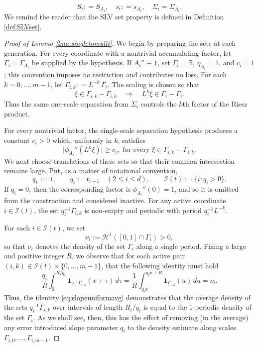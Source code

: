 \documentclass[12pt]{amsart}
\numberwithin{equation}{section}
\begin{document}
$$
S_{i} : = S_{A_i}, \quad s_i : = s_{A_i}, \quad \Sigma_i = \Sigma_{A_i}.
$$
We remind the reader that the SLV set property is defined in Definition \ref{def:SLVset}.

\begin{proof}[Proof of Lemma \ref{lma:singletomulti}]
We begin by preparing the sets at each generation.  For every coordinate with a nontrivial accumulating factor, let $\Gamma_i=\Gamma_{A_i}$ be supplied by the hypothesis.  If $A_i''\equiv1$, set $\Gamma_i=\mathbb R$,
$\eta_{A_i}=1$, and $c_i=1$; this convention imposes no restriction and
contributes no loss.  For each $k = 0,...,m-1$, let
$
\Gamma_{i,k} : = L^{-k} \,\Gamma_i.
$
The scaling is chosen so that
$$
\xi\in\Gamma_{i,k}-\Gamma_{i,k}
\quad\Longrightarrow\quad
L^k\xi\in\Gamma_i-\Gamma_i.
$$
Thus the same one-scale separation from $\Sigma_i$ controls the $k$th factor of the Riesz product.

For every nontrivial factor, the single-scale separation hypothesis produces
a constant $c_i>0$ which, uniformly in $k$, satisfies
\begin{equation}\label{eq:SLVsize}
\big\lvert \phi_{A_i}'' (L^k \xi) \big\rvert \geq c_i, \textrm{ for every } \xi \in \Gamma_{i,k} - \Gamma_{i,k}.
\end{equation}
We next choose translations of these sets so that their common intersection remains large.  Put, as a matter of notational convention,
\[
 q_1:=1,\qquad q_i:=t_{i-1}\quad(2\leq i\leq d),
 \qquad \mathcal I(t):=\{i:q_i>0\}.
\]
If $q_i=0$, then the corresponding factor is
$\phi_{A_i}''(0)=1$, and so it is omitted from the construction and considered inactive. For any active
coordinate $i\in\mathcal I(t)$, the set $q_i^{-1}\Gamma_{i,k}$ is non-empty and periodic with
period $q_i^{-1}L^{-k}$.

For each $i \in \mathcal{I}(t)$, we set
\[
 \nu_i:=\mathcal H^1([0,1]\cap\Gamma_i)>0,
\]
so that $\nu_i$ denotes the density of the set $\Gamma_i$ along a single period. Fixing a large and positive integer $R$, we observe that for each active pair $(i,k) \in \mathcal{I}(t) \times \{0,...,m-1\}$, that the following identity must hold
\begin{equation}\label{eq:slopeuniformavg}
 \frac{q_i}{R}\int_0^{R/q_i}
 \mathbf 1_{q_i^{-1}\Gamma_{i,k}}(x+\tau)\,d\tau =\frac1R\int_{q_ix}^{q_ix+R}\mathbf 1_{\Gamma_{i,k}}(u)\,du = \nu_i.      
\end{equation}
Thus, the identity \eqref{eq:slopeuniformavg} demonstrates that the average density of the sets $q_i^{-1} \Gamma_{i,k}$ over intervals of length $R_i/q_i$ is equal to the $1$-periodic density of the set $\Gamma_i$. As we shall see, then, this has the effect of removing (in the average) any error introduced slope parameter $q_i$ to the density estimate along scales $\Gamma_{i,0},...,\Gamma_{i,m-1}$.


\end{proof}
\end{document}
